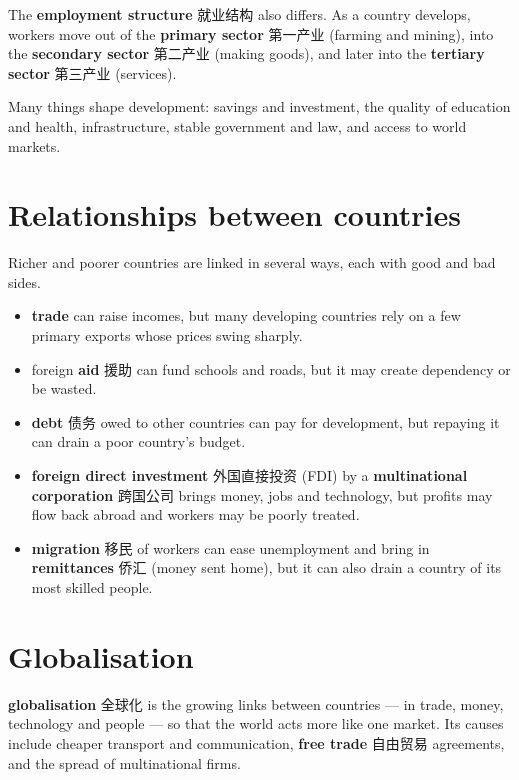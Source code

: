 \documentclass[11pt]{article}
\begin{document}
The \textbf{employment structure} 就业结构 also differs. As a country develops, workers move out of the \textbf{primary sector} 第一产业 (farming and mining), into the \textbf{secondary sector} 第二产业 (making goods), and later into the \textbf{tertiary sector} 第三产业 (services).

Many things shape development: savings and investment, the quality of education and health, infrastructure, stable government and law, and access to world markets.

\section*{Relationships between countries}

Richer and poorer countries are linked in several ways, each with good and bad sides.

\begin{itemize}
\item \textbf{trade} can raise incomes, but many developing countries rely on a few primary exports whose prices swing sharply.

\item foreign \textbf{aid} 援助 can fund schools and roads, but it may create dependency or be wasted.

\item \textbf{debt} 债务 owed to other countries can pay for development, but repaying it can drain a poor country's budget.

\item \textbf{foreign direct investment} 外国直接投资 (FDI) by a \textbf{multinational corporation} 跨国公司 brings money, jobs and technology, but profits may flow back abroad and workers may be poorly treated.

\item \textbf{migration} 移民 of workers can ease unemployment and bring in \textbf{remittances} 侨汇 (money sent home), but it can also drain a country of its most skilled people.

\end{itemize}

\section*{Globalisation}

\textbf{globalisation} 全球化 is the growing links between countries — in trade, money, technology and people — so that the world acts more like one market. Its causes include cheaper transport and communication, \textbf{free trade} 自由贸易 agreements, and the spread of multinational firms.
\end{document}
